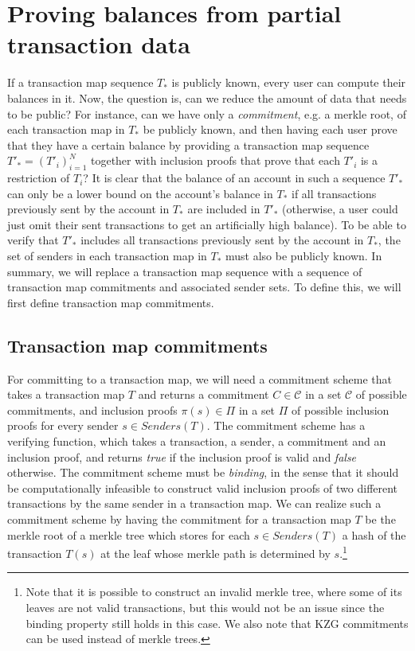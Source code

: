 \section{Proving balances from partial transaction data}\label{section:balance-proofs}

If a transaction map sequence \(T_*\) is publicly known, every user can compute their balances in it. Now, the question is, can we reduce the amount of data that needs to be public? For instance, can we have only a \emph{commitment}, e.g. a merkle root, of each transaction map in \(T_*\) be publicly known, and then having each user prove that they have a certain balance by providing a transaction map sequence \(T'_* = (T'_i)_{i=1}^N\) together with inclusion proofs that prove that each \(T'_i\) is a restriction of \(T_i\)? It is clear that the balance of an account in such a sequence \(T'_*\) can only be a lower bound on the account's balance in \(T_*\) if all transactions previously sent by the account in \(T_*\) are included in \(T'_*\) (otherwise, a user could just omit their sent transactions to get an artificially high balance). To be able to verify that \(T'_*\) includes all transactions previously sent by the account in \(T_*\), the set of senders in each transaction map in \(T_*\) must also be publicly known. In summary, we will replace a transaction map sequence with a sequence of transaction map commitments and associated sender sets. To define this, we will first define transaction map commitments.

\subsection{Transaction map commitments}

For committing to a transaction map, we will need a commitment scheme that takes a transaction map \(T\) and returns a commitment \(C \in \mathcal{C}\) in a set \(\mathcal{C}\) of possible commitments, and inclusion proofs \(\pi(s) \in \Pi\) in a set \(\Pi\) of possible inclusion proofs for every sender \(s \in Senders(T)\). The commitment scheme has a verifying function, which takes a transaction, a sender, a commitment and an inclusion proof, and returns \emph{true} if the inclusion proof is valid and \emph{false} otherwise. The commitment scheme must be \emph{binding}, in the sense that it should be computationally infeasible to construct valid inclusion proofs of two different transactions by the same sender in a transaction map. We can realize such a commitment scheme by having the commitment for a transaction map \(T\) be the merkle root of a merkle tree which stores for each \(s \in Senders(T)\) a hash of the transaction \(T(s)\) at the leaf whose merkle path is determined by \(s\).\footnote{Note that it is possible to construct an invalid merkle tree, where some of its leaves are not valid transactions, but this would not be an issue since the binding property still holds in this case. We also note that KZG commitments can be used instead of merkle trees.}

